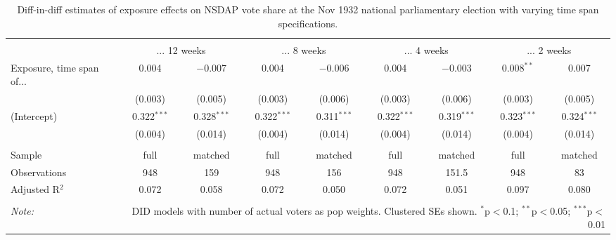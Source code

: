 
\begin{table}[!htbp] \centering 
  \caption{Diff-in-diff estimates of exposure effects on NSDAP vote share at the Nov 1932 national parliamentary election with varying time span specifications.\vspace{-.25cm}} 
  \label{tab:nsdap-voteshare-timespan-dd-1932-2} 
\scriptsize 
\begin{tabular}{@{\extracolsep{5pt}}lcccccccc} 
\\[-1.8ex]\hline 
\hline \\[-1.8ex] 
 & \multicolumn{2}{c}{... 12 weeks} & \multicolumn{2}{c}{... 8 weeks} & \multicolumn{2}{c}{... 4 weeks} & \multicolumn{2}{c}{... 2 weeks} \\ 
 \cmidrule(r){2-3}\cmidrule(r){4-5}\cmidrule(r){6-7}\cmidrule(r){8-9}Exposure, time span of... & 0.004 & $-$0.007 & 0.004 & $-$0.006 & 0.004 & $-$0.003 & 0.008$^{**}$ & 0.007 \\ 
  & (0.003) & (0.005) & (0.003) & (0.006) & (0.003) & (0.006) & (0.003) & (0.005) \\ 
  (Intercept) & 0.322$^{***}$ & 0.328$^{***}$ & 0.322$^{***}$ & 0.311$^{***}$ & 0.322$^{***}$ & 0.319$^{***}$ & 0.323$^{***}$ & 0.324$^{***}$ \\ 
  & (0.004) & (0.014) & (0.004) & (0.014) & (0.004) & (0.014) & (0.004) & (0.014) \\ 
 \hline \\[-1.8ex] 
Sample & full & matched & full & matched & full & matched & full & matched \\ 
Observations & 948 & 159 & 948 & 156 & 948 & 151.5 & 948 & 83 \\ 
Adjusted R$^{2}$ & 0.072 & 0.058 & 0.072 & 0.050 & 0.072 & 0.051 & 0.097 & 0.080 \\ 
\hline 
\hline \\[-1.8ex] 
\textit{Note:}  & \multicolumn{8}{r}{DID models with number of actual voters as pop weights. Clustered SEs shown. $^{*}$p$<$0.1; $^{**}$p$<$0.05; $^{***}$p$<$0.01} \\ 
\end{tabular} 
\end{table} 
